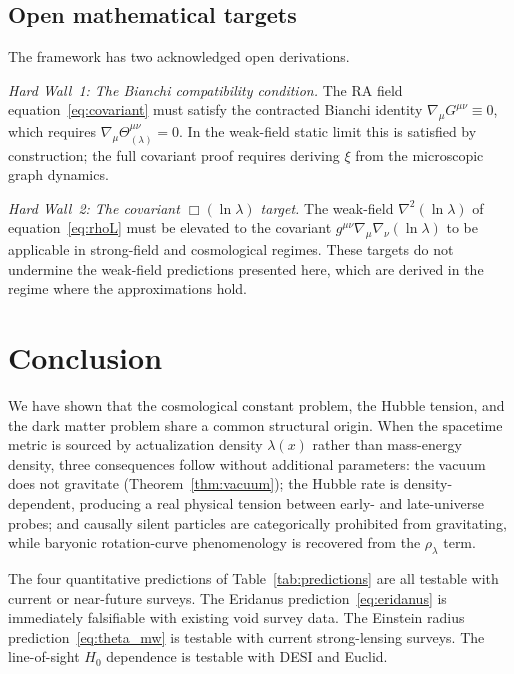 \documentclass[11pt,twocolumn]{article}
\theoremstyle{plain}
\theoremstyle{remark}
\begin{document}
\subsection{Open mathematical targets}

The framework has two acknowledged open derivations.

\emph{Hard Wall~1: The Bianchi compatibility condition.}
The RA field equation~\eqref{eq:covariant} must satisfy the
contracted Bianchi identity $\nabla_\mu G^{\mu\nu} \equiv 0$,
which requires $\nabla_\mu\Theta^{\mu\nu}_{(\lambda)} = 0$.
In the weak-field static limit this is satisfied by construction;
the full covariant proof requires deriving $\xi$ from the
microscopic graph dynamics.

\emph{Hard Wall~2: The covariant $\Box(\ln\lambda)$ target.}
The weak-field $\nabla^2(\ln\lambda)$ of equation~\eqref{eq:rhoL}
must be elevated to the covariant $g^{\mu\nu}\nabla_\mu\nabla_\nu
(\ln\lambda)$ to be applicable in strong-field and cosmological
regimes.
These targets do not undermine the weak-field predictions presented
here, which are derived in the regime where the approximations hold.

\section{Conclusion}
\label{sec:conclusion}

We have shown that the cosmological constant problem, the Hubble
tension, and the dark matter problem share a common structural
origin.
When the spacetime metric is sourced by actualization density
$\lambda(x)$ rather than mass-energy density, three consequences
follow without additional parameters: the vacuum does not gravitate
(Theorem~\ref{thm:vacuum}); the Hubble rate is density-dependent,
producing a real physical tension between early- and late-universe
probes; and causally silent particles are categorically prohibited
from gravitating, while baryonic rotation-curve phenomenology is
recovered from the $\rho_\lambda$ term.

The four quantitative predictions of Table~\ref{tab:predictions}
are all testable with current or near-future surveys.
The Eridanus prediction~\eqref{eq:eridanus} is immediately
falsifiable with existing void survey data.
The Einstein radius prediction~\eqref{eq:theta_mw} is testable
with current strong-lensing surveys.
The line-of-sight $H_0$ dependence is testable with DESI and Euclid.
\end{document}
